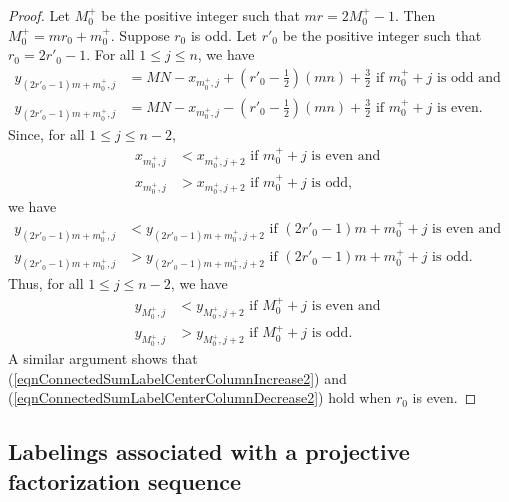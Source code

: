 \documentclass[12pt]{amsart}
\theoremstyle{definition}
\theoremstyle{plain}
\begin{document}
\begin{proof}
   Let $M^{+}_0$ be the positive integer such that $mr= 2M^{+}_0 -1$.
   Then $M^{+}_0 = m r_0 + m^{+}_0$.
   Suppose $r_0$ is odd. Let $r'_0$ be the positive integer such that $r_0 = 2 r'_0 -1$.
   For all $1 \leqslant j \leqslant n$, we have
   \begin{align*}
      y_{(2r'_0 -1)m+m^{+}_0,j} &= MN - x_{m^{+}_0,j} +(r'_0 -\tfrac{1}{2})(mn)  +\tfrac{3}{2} \mbox{ \ if }  m^{+}_0+j \mbox{ is odd and } \\
      y_{(2r'_0 -1)m+m^{+}_0,j} &= MN - x_{m^{+}_0,j} - (r'_0 -\tfrac{1}{2})(mn)  +\tfrac{3}{2} \mbox{ \ if }  m^{+}_0+j \mbox{ is even.}
   \end{align*}
   Since, for all  $1 \leqslant j \leqslant n-2$,
   \begin{align*}
    x_{m_0^{+},j} &<  x_{m_0^{+},j+2} \mbox{ \ if } m^{+}_0 +j  \mbox{ is even and }  \\
    x_{m_0^{+},j} &>  x_{m_0^{+},j+2} \mbox{ \ if } m^{+}_0 +j  \mbox{ is odd,}
  \end{align*}
   we have
   \begin{align*}
    y_{(2r'_0 -1)m+ m_0^{+},j} &<  y_{(2r'_0 -1)m+ m_0^{+},j+2} \mbox{ \ if }  (2r'_0 -1)m+ m^{+}_0 +j \mbox{ is even and }  \\
    y_{(2r'_0 -1)m+ m_0^{+},j} &>  y_{(2r'_0 -1)m+ m_0^{+},j+2} \mbox{ \ if }  (2r'_0 -1)m+ m^{+}_0 +j \mbox{ is odd.}
  \end{align*}
   Thus, for all $1 \leqslant j \leqslant n-2$, we have
   \begin{align}
    y_{M_0^{+},j} &<  y_{M_0^{+},j+2}   \mbox{ \ if } M^{+}_0 +j \mbox{ is even and } \label{eqnConnectedSumLabelCenterColumnIncrease2}  \\
    y_{M_0^{+},j} &>  y_{M_0^{+},j+2}   \mbox{ \ if } M^{+}_0 +j \mbox{ is odd.} \label{eqnConnectedSumLabelCenterColumnDecrease2}
  \end{align}
   A similar argument shows that (\ref{eqnConnectedSumLabelCenterColumnIncrease2}) and (\ref{eqnConnectedSumLabelCenterColumnDecrease2}) hold when $r_0$ is even.
\end{proof}

\subsection{Labelings associated with a projective factorization sequence}
\end{document}
